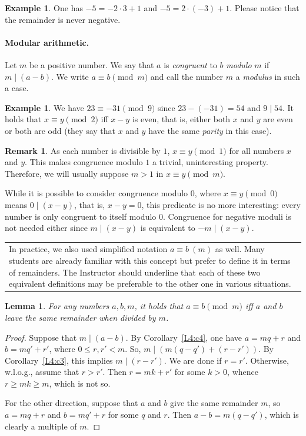 \documentclass[12pt,notitlepage]{article}
\theoremstyle{plain}
\newtheorem{lemma}[thm]{Lemma}
\theoremstyle{definition}
\newtheorem{exm}[thm]{Example}
\newtheorem{rem}[thm]{Remark}
\theoremstyle{plain}
\newcommand{\1}{\mathbf{1}}
\newcommand{\0}{\mathbf{0}}
\newcommand{\dvd}{\mathop{\mid}}
\newcommand{\mcomm}[1]{
\medskip\noindent\begin{tabular}{| l}
\parbox{0.99\textwidth}{{\small
#1 }}\end{tabular}
\smallskip}
\begin{document}
\begin{exm}
One has $-5 = -2 \cdot 3 + 1$ and $-5 = 2 \cdot (-3) + 1$. Please notice that the remainder is never negative.
\end{exm}

\paragraph{Modular arithmetic.}

Let $m$ be a positive number. We say that $a$ is \emph{congruent} to $b$ \emph{modulo} $m$ if $m \dvd (a - b)$.  We write $a \equiv b \pmod m$ and call the number $m$ a \emph{modulus} in such a case.

\begin{exm}
We have $23 \equiv -31 \pmod 9$ since $23 - (-31) = 54$ and $9 \dvd 54$. It holds that $x \equiv y \pmod 2$ iff $x - y$ is even, that is, either both $x$ and $y$ are even or both are odd (they say that $x$ and $y$ have the same \emph{parity} in this case).
\end{exm}

\begin{rem}
As each number is divisible by $1$, $x \equiv y \pmod 1$ for all numbers $x$ and $y$. This makes congruence modulo $1$ a trivial, uninteresting property. Therefore, we will usually suppose $m > 1$ in $x \equiv y \pmod m$.

While it is possible to consider congruence modulo $0$, where $x \equiv y \pmod 0$ means $0 \dvd (x - y)$, that is, $x - y = 0$, this predicate is no more interesting: every number is only congruent to itself modulo $0$. Congruence for negative moduli is not needed either since $m \dvd (x - y)$ is equivalent to $-m \dvd (x - y)$.
\end{rem}

\mcomm{In practice, we also used simplified notation $a \equiv b\ (m)$ as well. Many students are already familiar with this concept but prefer to define it in terms of remainders. The Instructor should underline that each of these two equivalent definitions may be preferable to the other one in various situations.}

\begin{lemma}\label{L4:l5}
For any numbers $a, b, m$, it holds that $a \equiv b \pmod m$ iff $a$ and $b$ leave the same remainder when divided by $m$.
\end{lemma}
\begin{proof}
Suppose that $m \dvd (a - b)$. By Corollary~\ref{L4:c4}, one have $a = m q + r$ and $b = m q' + r'$, where $0 \leq r, r' < m$. So, $m \dvd (m(q - q') + (r - r'))$. By Corollary~\ref{L4:c3}, this implies $m \dvd (r - r')$. We are done if $r = r'$. Otherwise, w.l.o.g., assume that $r > r'$. Then $r = mk + r'$ for some $k > 0$, whence $r \geq mk \geq m$, which is not so.

For the other direction, suppose that $a$ and $b$ give the same remainder $m$, so $a = m q + r$ and $b = m q' + r$ for some $q$ and $r$. Then $a - b = m(q - q')$, which is clearly a multiple of $m$.
\end{proof}
\end{document}

